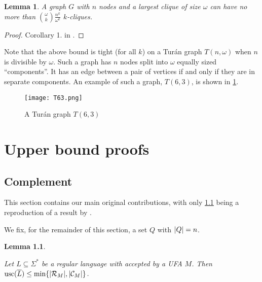 \documentclass{report}
\DeclarePairedDelimiter{\set}{\{}{\}}
\DeclarePairedDelimiter{\abs}{\lvert}{\rvert}
\newtheorem{lemma}[theorem]{Lemma}
\theoremstyle{definition}
\begin{document}
\begin{lemma} \label{lma.num_cliques_of_size}
A graph $G$ with $n$ nodes and a largest clique of size $\omega$ can have 
no more than $\binom{\omega}{k} \frac{n^k}{\omega^k}$ $k$-cliques.
\end{lemma}

\begin{proof}
Corollary 1. in \cite{cliques}.
\end{proof}

Note that the above bound is tight (for all $k$) on a Tur\'an graph $T(n, \omega)$
when $n$ is divisible by $\omega$. Such a graph has $n$ nodes split into $\omega$
equally sized ``components''. It has an edge between a pair of vertices if and only
if they are in separate components. An example of such a graph, $T(6, 3)$, is shown
in \cref{fig.T63}.

\begin{figure}[h]
\centering
\texttt{[image: T63.png]}
\caption{A Tur\'an graph $T(6, 3)$}
\label{fig.T63}
\end{figure}

\chapter{Upper bound proofs}

\section{Complement}

This section contains our main original contributions, with only
\cref{lma.UFA_complement_construction} being a reproduction of a result
by \cite{UFA_UB}.

We fix, for the remainder of this section, a set $Q$ with $\abs{Q} = n$.

\begin{lemma} \label{lma.UFA_complement_construction}
\begin{sloppypar}
Let $L \subseteq \Sigma^{\ast}$ be a regular language with accepted by a UFA $M$.
Then ${\mathrm{usc}(\overline{L}) \leq
\min\set{\abs{\mathcal{R}_M}, \abs{\mathcal{C}_M}}}$.
\end{sloppypar}
\end{lemma}
\end{document}
